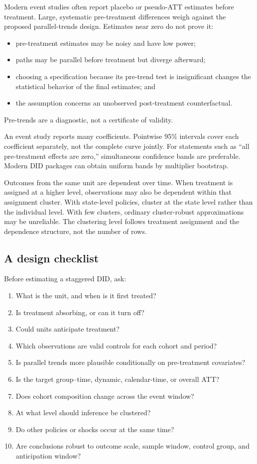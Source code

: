 Modern event studies often report placebo or pseudo-ATT estimates before
treatment.  Large, systematic pre-treatment differences weigh against the
proposed parallel-trends design.  Estimates near zero do not prove it:
\begin{itemize}
  \item pre-treatment estimates may be noisy and have low power;
  \item paths may be parallel before treatment but diverge afterward;
  \item choosing a specification because its pre-trend test is insignificant
        changes the statistical behavior of the final estimates; and
  \item the assumption concerns an unobserved post-treatment counterfactual.
\end{itemize}
Pre-trends are a diagnostic, not a certificate of validity.

An event study reports many coefficients.  Pointwise 95\% intervals cover each
coefficient separately, not the complete curve jointly.  For statements such
as ``all pre-treatment effects are zero,'' simultaneous confidence bands are
preferable.  Modern DID packages can obtain uniform bands by multiplier
bootstrap.

Outcomes from the same unit are dependent over time.  When treatment is assigned
at a higher level, observations may also be dependent within that assignment
cluster.  With state-level policies, cluster at the state level rather than the
individual level.  With few clusters, ordinary cluster-robust approximations
may be unreliable.  The clustering level follows treatment assignment and the
dependence structure, not the number of rows.

\subsection{A design checklist}

Before estimating a staggered DID, ask:
\begin{enumerate}
  \item What is the unit, and when is it first treated?
  \item Is treatment absorbing, or can it turn off?
  \item Could units anticipate treatment?
  \item Which observations are valid controls for each cohort and period?
  \item Is parallel trends more plausible conditionally on pre-treatment
        covariates?
  \item Is the target group--time, dynamic, calendar-time, or overall ATT?
  \item Does cohort composition change across the event window?
  \item At what level should inference be clustered?
  \item Do other policies or shocks occur at the same time?
  \item Are conclusions robust to outcome scale, sample window, control group,
        and anticipation window?
\end{enumerate}

